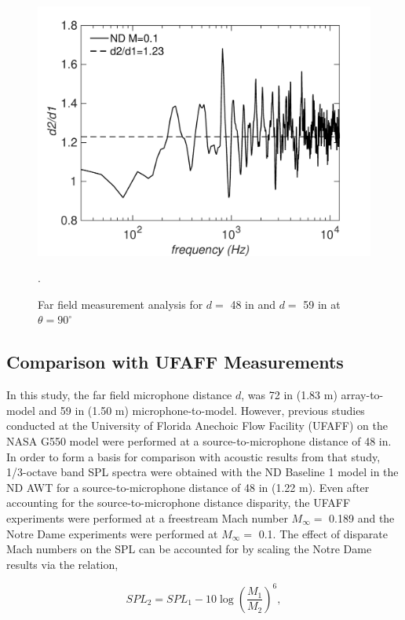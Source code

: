 \begin{figure}
	\begin{center}
		\centerline{\includegraphics[scale=0.7]{figures/mic_far}}
		\caption{Far field measurement analysis for $d =$ 48 in and $d =$ 59 in at $\theta = 90^\circ$}.
		\label{fig:far}
	\end{center}
\end{figure}

\subsection{Comparison with UFAFF Measurements}
In this study, the far field microphone distance $d$, was 72 in (1.83 m) array-to-model and 59 in (1.50 m) microphone-to-model. However, previous studies conducted at the University of Florida Anechoic Flow Facility (UFAFF) on the NASA G550 model were performed at a source-to-microphone distance of 48 in. In order to form a basis for comparison with acoustic results from that study, 1/3-octave band SPL spectra were obtained with the ND Baseline 1 model in the ND AWT for a source-to-microphone distance of 48 in (1.22 m). Even after accounting for the source-to-microphone distance disparity, the UFAFF experiments were performed at a freestream Mach number $M_\infty =$ 0.189 and the Notre Dame experiments were performed at $M_\infty=$ 0.1. The effect of disparate Mach numbers on the SPL can be accounted for by scaling the Notre Dame results via the relation, 

\begin{equation}
SPL_2 = SPL_1 - 10 \log \left( \frac{M_1}{M_2} \right)^6,
\end{equation}

